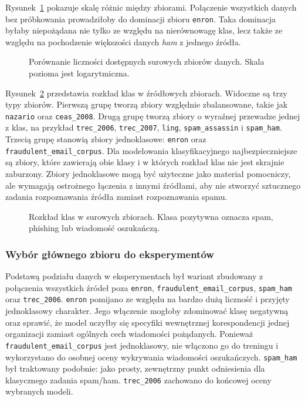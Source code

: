 Rysunek~\ref{fig:raw-dataset-sizes} pokazuje skalę różnic między zbiorami.
Połączenie wszystkich danych bez próbkowania prowadziłoby do dominacji zbioru
\texttt{enron}. Taka dominacja byłaby niepożądana nie tylko ze względu na
nierównowagę klas, lecz także ze względu na pochodzenie większości danych \textit{ham}
z jednego źródła.

\begin{figure}[htbp]
\centering

\caption{Porównanie liczności dostępnych surowych zbiorów danych. Skala pozioma
jest logarytmiczna.}
\label{fig:raw-dataset-sizes}
\end{figure}

Rysunek~\ref{fig:raw-class-balance} przedstawia rozkład klas w źródłowych
zbiorach. Widoczne są trzy typy zbiorów. Pierwszą grupę tworzą zbiory względnie
zbalansowane, takie jak \texttt{nazario} oraz \texttt{ceas\_2008}. Drugą grupę
tworzą zbiory o wyraźnej przewadze jednej z klas, na przykład
\texttt{trec\_2006}, \texttt{trec\_2007}, \texttt{ling},
\texttt{spam\_assassin} i \texttt{spam\_ham}.
Trzecią grupę stanowią zbiory jednoklasowe:
\texttt{enron} oraz \texttt{fraudulent\_email\_corpus}. Dla modelowania
klasyfikacyjnego najbezpieczniejsze są zbiory, które zawierają obie klasy i w
których rozkład klas nie jest skrajnie zaburzony. Zbiory jednoklasowe mogą być
użyteczne jako materiał pomocniczy, ale wymagają ostrożnego łączenia z innymi
źródłami, aby nie stworzyć sztucznego zadania rozpoznawania źródła zamiast
rozpoznawania spamu.

\begin{figure}[htbp]
\centering

\caption{Rozkład klas w surowych zbiorach. Klasa pozytywna oznacza spam,
phishing lub wiadomość oszukańczą.}
\label{fig:raw-class-balance}
\end{figure}

\subsubsection{Wybór głównego zbioru do eksperymentów}

Podstawą podziału danych w eksperymentach był wariant zbudowany z połączenia
wszystkich źródeł poza \texttt{enron}, \texttt{fraudulent\_email\_corpus},
\texttt{spam\_ham} oraz \texttt{trec\_2006}. \texttt{enron} pomijano ze
względu na bardzo dużą liczność i przyjęty jednoklasowy charakter. Jego włączenie mogłoby
zdominować klasę negatywną oraz sprawić, że model uczyłby się specyfiki
wewnętrznej korespondencji jednej organizacji zamiast ogólnych cech wiadomości
pożądanych. Ponieważ \texttt{fraudulent\_email\_corpus} jest jednoklasowy, nie
włączono go do treningu i wykorzystano do osobnej oceny wykrywania wiadomości
oszukańczych.
\texttt{spam\_ham} był traktowany podobnie: jako prosty, zewnętrzny punkt
odniesienia dla klasycznego zadania spam/ham.
\texttt{trec\_2006} zachowano do końcowej oceny wybranych modeli.

